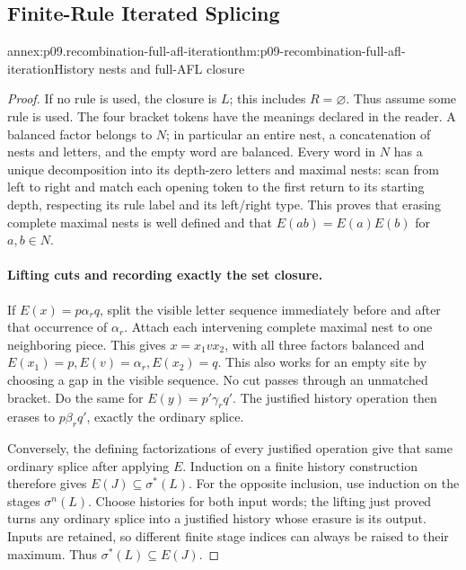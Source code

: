 \subsection{Finite-Rule Iterated Splicing}
\label{annex:p09-recombination-iterated-closures}

\begin{annexitem}{annex:p09.recombination-full-afl-iteration}{thm:p09-recombination-full-afl-iteration}{History nests and full-AFL closure}
\begin{proof}
If no rule is used, the closure is \(L\); this includes \(R=\varnothing\).
Thus assume some rule is used. The four bracket tokens have the meanings
declared in the reader. A balanced factor belongs to \(N\); in particular
an entire nest, a concatenation of nests and letters, and the empty word
are balanced. Every word in \(N\) has a unique decomposition into its
depth-zero letters and maximal nests: scan from left to right and match
each opening token to the first return to its starting depth, respecting
its rule label and its left/right type. This proves that erasing complete
maximal nests is well defined and that \(E(ab)=E(a)E(b)\) for \(a,b\in N\).

\paragraph{Lifting cuts and recording exactly the set closure.}
If \(E(x)=p\alpha_rq\), split the visible letter sequence immediately
before and after that occurrence of \(\alpha_r\). Attach each intervening
complete maximal nest to one neighboring piece. This gives
\(x=x_1vx_2\), with all three factors balanced and
\(E(x_1)=p,E(v)=\alpha_r,E(x_2)=q\).
This also works for an empty site by choosing a gap in the visible
sequence. No cut passes through an unmatched bracket. Do the same for
\(E(y)=p'\gamma_rq'\). The justified history operation then erases to
\(p\beta_rq'\), exactly the ordinary splice.

Conversely, the defining factorizations of every justified operation give
that same ordinary splice after applying \(E\).
Induction on a finite history construction therefore gives
\(E(J)\subseteq\sigma^*(L)\). For the opposite inclusion, use induction
on the stages \(\sigma^n(L)\). Choose histories for both input words;
the lifting just proved turns any ordinary splice into a justified history
whose erasure is its output. Inputs are retained, so different finite
stage indices can always be raised to their maximum. Thus
\(\sigma^*(L)\subseteq E(J)\).


\end{proof}
\end{annexitem}
